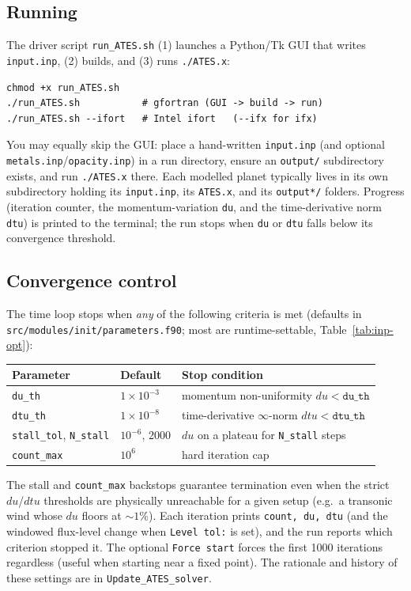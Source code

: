 \documentclass[english,a4paper]{kiseon_memo}
\begin{document}
\subsection{Running}
The driver script \texttt{run\_ATES.sh} (1) launches a Python/Tk GUI that writes
\texttt{input.inp}, (2) builds, and (3) runs \texttt{./ATES.x}:
\begin{lstlisting}[style=sh]
chmod +x run_ATES.sh
./run_ATES.sh           # gfortran (GUI -> build -> run)
./run_ATES.sh --ifort   # Intel ifort   (--ifx for ifx)
\end{lstlisting}
You may equally skip the GUI: place a hand-written \texttt{input.inp} (and
optional \texttt{metals.inp}/\texttt{opacity.inp}) in a run directory, ensure an
\texttt{output/} subdirectory exists, and run \texttt{./ATES.x} there. Each
modelled planet typically lives in its own subdirectory holding its
\texttt{input.inp}, its \texttt{ATES.x}, and its \texttt{output*/} folders.
Progress (iteration counter, the momentum-variation \texttt{du}, and the
time-derivative norm \texttt{dtu}) is printed to the terminal; the run stops when
\texttt{du} or \texttt{dtu} falls below its convergence threshold.

\subsection{Convergence control}\label{sec:convctl}
The time loop stops when \emph{any} of the following criteria is met
(defaults in \texttt{src/modules/init/parameters.f90}; most are runtime-settable,
Table~\ref{tab:inp-opt}):
\begin{center}\small
\begin{tabular}{@{}lll@{}}
\toprule
Parameter & Default & Stop condition \\
\midrule
\texttt{du\_th}    & $1\times10^{-3}$ & momentum non-uniformity $du<\texttt{du\_th}$ \\
\texttt{dtu\_th}   & $1\times10^{-8}$ & time-derivative $\infty$-norm $dtu<\texttt{dtu\_th}$ \\
\texttt{stall\_tol}, \texttt{N\_stall} & $10^{-6}$, 2000 & $du$ on a plateau for \texttt{N\_stall} steps \\
\texttt{count\_max} & $10^{6}$ & hard iteration cap \\
\bottomrule
\end{tabular}
\end{center}
The stall and \texttt{count\_max} backstops guarantee termination even when the
strict $du$/$dtu$ thresholds are physically unreachable for a given setup (e.g.\ a
transonic wind whose $du$ floors at $\sim1\%$). Each iteration prints
\texttt{count, du, dtu} (and the windowed flux-level change when
\texttt{Level tol:} is set), and the run reports which criterion stopped it. The
optional \texttt{Force start} forces the first 1000 iterations regardless (useful
when starting near a fixed point). The rationale and history of these settings are
in \texttt{Update\_ATES\_solver}.
\end{document}

